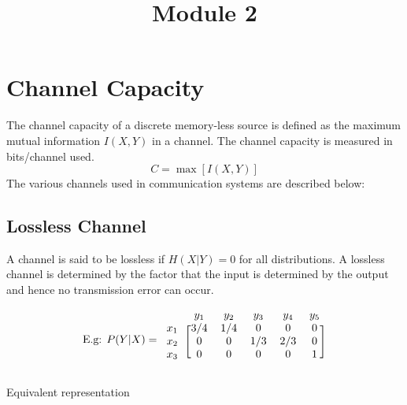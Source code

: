 \documentclass[12pt]{article}
\title{Module 2}
\begin{document}
\maketitle
\section{Channel Capacity}
The channel capacity of a discrete memory-less source is defined as the maximum mutual information $I(X,Y)$ in a channel. 
The channel capacity is measured in bits/channel used. 
$$C = \max [ I(X,Y) ]$$ 
The various channels used in communication systems are described below: 

\subsection{Lossless Channel}
A channel is said to be lossless if $H(X|Y) = 0$ for all distributions. 
A lossless channel is determined by the factor that the input is determined by the output and hence no transmission error can occur. 

\begin{minipage}{.4\linewidth}
$$\text{E.g: } P(Y|X) = \begin{blockarray}{cccccc}
 & y_1 & y_2 & y_3 & y_4 & y_5 \\
\begin{block}{c[ccccc]}
x_1 & 3/4 & 1/4 & 0 & 0 & 0 \\ 
x_2 & 0 & 0 & 1/3 & 2/3 & 0 \\ 
x_3 & 0 & 0 & 0 & 0 & 1 \\
\end{block}
\end{blockarray}$$
\end{minipage}%
\hfill
\begin{minipage}{.3\linewidth}
\centering
{}
Equivalent representation
\end{minipage}
\end{document}
